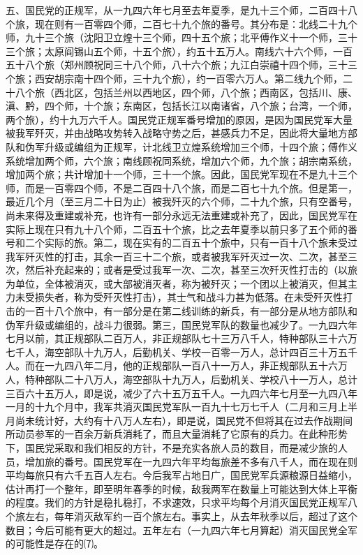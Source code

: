 \documentclass[UTF-8, a5paper, 12pt]{ctexart}
\begin{document}
五、国民党的正规军，从一九四六年七月至去年夏季，是九十三个师，二百四十八个旅，现在则有一百零四个师，二百七十九个旅的番号。其分布是：北线二十九个师，九十三个旅（沈阳卫立煌十三个师，四十五个旅；北平傅作义十一个师，三十三个旅；太原阎锡山五个师，十五个旅），约五十五万人。南线六十六个师，一百五十八个旅（郑州顾祝同三十八个师，八十六个旅；九江白崇禧十四个师，三十三个旅；西安胡宗南十四个师，三十九个旅），约一百零六万人。第二线九个师，二十八个旅（西北区，包括兰州以西地区，四个师，八个旅；西南区，包括川、康、滇、黔，四个师，十个旅；东南区，包括长江以南诸省，八个旅；台湾，一个师，两个旅），约十九万六千人。国民党正规军番号增加的原因，是因为国民党军大量被我军歼灭，并由战略攻势转入战略守势之后，甚感兵力不足，因此将大量地方部队和伪军升级或编组为正规军，计北线卫立煌系统增加三个师，十四个旅；傅作义系统增加两个师，六个旅；南线顾祝同系统，增加六个师，九个旅；胡宗南系统，增加两个旅；共计增加十一个师，三十一个旅。因此，国民党军现在不是九十三个师，而是一百零四个师，不是二百四十八个旅，而是二百七十九个旅。但是第一，最近几个月（至三月二十日为止）被我歼灭的六个师，二十九个旅，只有空番号，尚未来得及重建或补充，也许有一部分永远无法重建或补充了，因此，国民党军在实际上现在只有九十八个师，二百五十个旅，比之去年夏季以前只多了五个师的番号和二个实际的旅。第二，现在实有的二百五十个旅中，只有一百十八个旅未受过我军歼灭性的打击，其余一百三十二个旅，或者被我军歼灭过一次、二次，甚至三次，然后补充起来的；或者是受过我军一次、二次，甚至三次歼灭性打击的（以旅为单位，全体被消灭，或大部被消灭者，称为被歼灭；一个团以上被消灭，但其主力未受损失者，称为受歼灭性打击），其士气和战斗力甚为低落。在未受歼灭性打击的一百十八个旅中，有一部分是在第二线训练的新兵，有一部分是从地方部队和伪军升级或编组的，战斗力很弱。第三，国民党军队的数量也减少了。一九四六年七月以前，其正规部队二百万人，非正规部队七十三万八千人，特种部队三十六万七千人，海空部队十九万人，后勤机关、学校一百零一万人，总计四百三十万五千人。而在一九四八年二月，他的正规部队一百八十一万人，非正规部队五十六万人，特种部队二十八万人，海空部队十九万人，后勤机关、学校八十一万人，总计三百六十五万人，即是说，减少了六十五万五千人。一九四六年七月至一九四八年一月的十九个月中，我军共消灭国民党军队一百九十七万七千人（二月和三月上半月尚未统计好，大约有十八万人左右），即是说，国民党不但将其在过去作战期间所动员参军的一百余万新兵消耗了，而且大量消耗了它原有的兵力。在此种形势下，国民党采取和我们相反的方针，不是充实各旅人员的数目，而是减少旅的人员，增加旅的番号。国民党军在一九四六年平均每旅差不多有八千人，而在现在则平均每旅只有六千五百人左右。今后我军占地日广，国民党军兵源粮源日益缩小，估计再打一个整年，即至明年春季的时候，敌我两军在数量上可能达到大体上平衡的程度。我们的方针是稳扎稳打，不求速效，只求平均每个月消灭国民党正规军八个旅左右，每年消灭敌军约一百个旅左右。事实上，从去年秋季以后，超过了这个数目；今后可能有更大的超过。五年左右（一九四六年七月算起）消灭国民党全军的可能性是存在的⑺。
\end{document}
